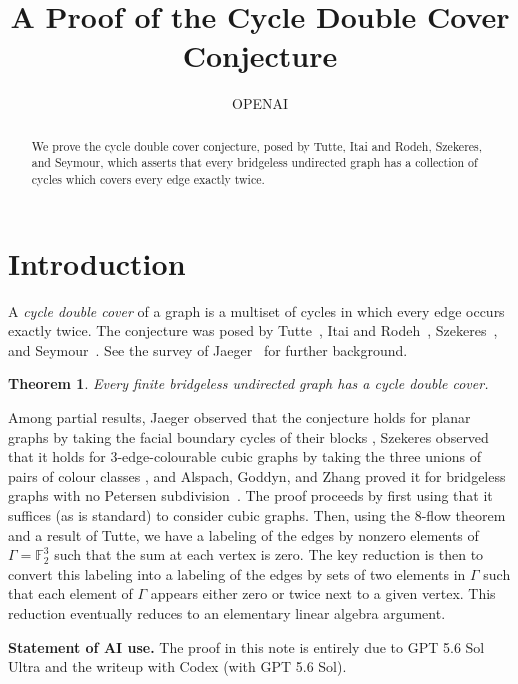 \documentclass{amsart}
\title{A Proof of the Cycle Double Cover Conjecture}
\author{OPENAI}
\date{}
\newtheorem{theorem}{Theorem}[section]
\newcommand{\F}{\mathbb{F}}
\begin{document}
\begin{abstract}
We prove the cycle double cover conjecture, posed by Tutte, Itai and Rodeh,
Szekeres, and Seymour, which asserts that every bridgeless undirected graph has
a collection of cycles which covers every edge exactly twice.
\end{abstract}

\maketitle

\section{Introduction}

A \emph{cycle double cover} of a graph is a multiset of cycles in which every
edge occurs exactly twice. The conjecture was posed by Tutte~\cite{Tutte1987},
Itai and Rodeh~\cite{ItaiRodeh1978}, Szekeres~\cite{Szekeres1973}, and
Seymour~\cite{Seymour1979}. See the survey of Jaeger~\cite{Jaeger1985} for
further background.

\begin{theorem}
Every finite bridgeless undirected graph has a cycle double cover.
\end{theorem}

Among partial results, Jaeger observed that the conjecture holds for planar
graphs by taking the facial boundary cycles of their blocks
\cite[Sections~2.1 and~3.1]{Jaeger1985}, Szekeres observed that it holds for
3-edge-colourable cubic graphs by taking the three unions of pairs of colour
classes \cite[p.~367]{Szekeres1973}, and Alspach, Goddyn, and Zhang proved it
for bridgeless graphs with no Petersen subdivision~\cite{AlspachGoddynZhang1994}.
The proof proceeds by first using that it suffices (as is standard) to consider
cubic graphs. Then, using the 8-flow theorem and a result of Tutte, we have a
labeling of the edges by nonzero elements of $\Gamma=\F_2^3$ such that the sum
at each vertex is zero. The key reduction is then to convert this labeling into
a labeling of the edges by sets of two elements in $\Gamma$ such that each
element of $\Gamma$ appears either zero or twice next to a given vertex. This
reduction eventually reduces to an elementary linear algebra argument.

\medskip
\noindent\textbf{Statement of AI use.}
The proof in this note is entirely due to GPT 5.6 Sol Ultra and the writeup
with Codex (with GPT 5.6 Sol).
\end{document}
